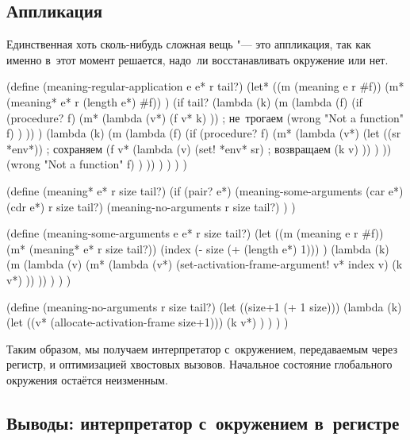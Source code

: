 \subsection{Аппликация}\label{fast/reject/ssect:application}

Единственная хоть сколь-нибудь сложная вещь "--- это аппликация, так как именно
в~этот момент решается, надо~ли восстанавливать окружение или нет.

\begin{code:lisp}
(define (meaning-regular-application e e* r tail?)
  (let* ((m (meaning e r #f))
         (m* (meaning* e* r (length e*) #f)) )
    (if tail? (lambda (k)
                (m (lambda (f)
                     (if (procedure? f)
                         (m* (lambda (v*)
                               (f v* k) ))              ; не~трогаем
                         (wrong "Not a function" f) ) )) )
        (lambda (k)
          (m (lambda (f)
               (if (procedure? f)
                   (m* (lambda (v*)
                         (let ((sr *env*))              ; сохраняем
                           (f v* (lambda (v)
                                   (set! *env* sr)      ; возвращаем
                                   (k v) )) ) ))
                   (wrong "Not a function" f) ) )) ) ) ) )

(define (meaning* e* r size tail?)
  (if (pair? e*)
      (meaning-some-arguments (car e*) (cdr e*) r size tail?)
      (meaning-no-arguments r size tail?) ) )

(define (meaning-some-arguments e e* r size tail?)
  (let ((m (meaning e r #f))
        (m* (meaning* e* r size tail?))
        (index (- size (+ (length e*) 1))) )
    (lambda (k)
      (m (lambda (v)
           (m* (lambda (v*)
                 (set-activation-frame-argument! v* index v)
                 (k v*) )) )) ) ) )

(define (meaning-no-arguments r size tail?)
  (let ((size+1 (+ 1 size)))
    (lambda (k)
      (let ((v* (allocate-activation-frame size+1)))
        (k v*) ) ) ) )
\end{code:lisp}

Таким образом, мы получаем интерпретатор с~окружением, передаваемым через
регистр, и оптимизацией хвостовых вызовов. Начальное состояние глобального
окружения остаётся неизменным.


\subsection{Выводы: интерпретатор с~окружением в~регистре}%
\label{fast/reject/ssect:conclusions}


